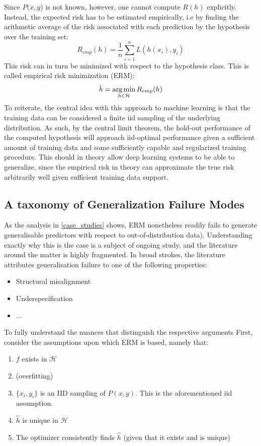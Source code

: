 		Since \(P(x,y\)) is not known, however, one cannot compute \(R(h)\) explicitly. Instead, the expected risk has to be estimated empirically, i.e by finding the arithmetic average of the risk associated with each prediction by the hypothesis over the training set:
		\begin{equation}
		R_{emp}(h) = \frac{1}{n}\sum_{i=1}^{n}L(h(x_i), y_i)
		\end{equation}
		This risk can in turn be minimized with respect to the hypothesis class. This is called empirical risk minimization (ERM):
		\begin{equation}
		\hat{h} = \operatorname*{arg\,min}_{h \in \mathcal{H}}R_{emp}(h)
		\end{equation}
		To reiterate, the central idea with this approach to machine learning is that the training data can be considered a finite iid sampling of the underlying distribution. As such, by the central limit theorem, the hold-out performance of the computed hypothesis will approach iid-optimal performance given a sufficient amount of training data and some sufficiently capable and regularized training procedure. This should in theory allow deep learning systems to be able to generalize, since the empirical risk in theory can approximate the true risk arbitrarily well given sufficient training data support.
	\subsection{A taxonomy of Generalization Failure Modes}
		As the analysis in \ref{case_studies} shows, ERM nonetheless readily fails to generate generalisable predictors with respect to out-of-distribution data). Understanding exactly why this is the case is a subject of ongoing study, and the literature around the matter is highly fragmented. In broad strokes, the literature attributes generalisation failure to one of the following properties:
		\begin{itemize}
			\item Structural misalignment
			\item Underspecification
			\item ...
		\end{itemize}
		
		To fully understand the nuances that distinguish the respective arguments First, consider the assumptions upon which ERM is based, namely that:
		\begin{enumerate}
			\item \(f\) exists in \(\mathcal{H}\) \label{underfit}
			\item (overfitting) \label{overfit}
			\item \(\{x_i, y_i\}\) is an IID sampling of \(P(x,y)\). This is the aforementioned iid assumption. \label{structural_misalignment}
			\item \(\hat{h}\) is unique in \(\mathcal{H}\)\label{underspecification}
			\item The optimizer consistently finds \(\hat{h}\) (given that it exists and is unique)\label{opt}
		\end{enumerate}  	
		
